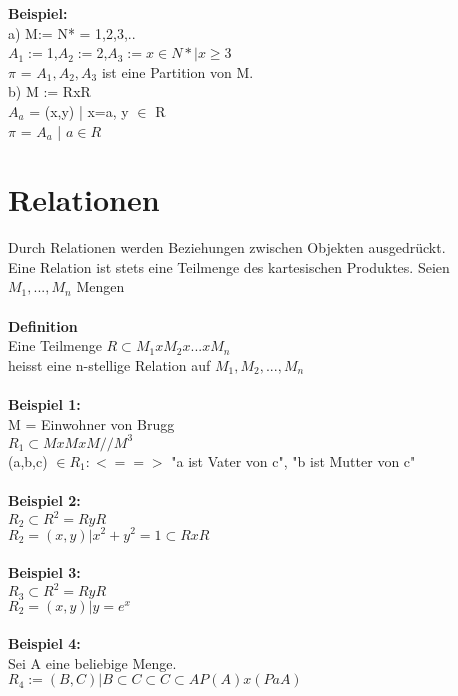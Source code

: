 \documentclass[11pt,a4paper]{article}
\begin{document}
\textbf{Beispiel:}\\
a) M:= N* = {1,2,3,..} \\
$A_1 := ${1},$ A_2 := ${2},$ A_3 := ${$x \in N* | x \geq 3$} \\
$\pi$ = {$A_1,A_2,A_3$} ist eine Partition von M.\\
b) M := RxR \\
$A_a$ = {(x,y) | x=a, y $\in$ R }\\

$\pi$ = { $A_a $ | $a \in R $}

\section{Relationen}
Durch Relationen werden Beziehungen zwischen Objekten ausgedrückt.\\
Eine Relation ist stets eine Teilmenge des kartesischen Produktes.
Seien $M_1,...,M_n$ Mengen\\\\

\textbf{Definition}\\
Eine Teilmenge $ R \subset M_1 x M_2 x ... x M_n$\\
heisst eine n-stellige Relation auf $M_1, M_2,...,M_n$\\\\

\textbf{Beispiel 1:}\\
M = { Einwohner von Brugg }\\
$R_1 \subset MxMxM // M^3 $\\
(a,b,c) $ \in R_1 : <==> $ "a ist Vater von c", "b ist Mutter von c"\\\\

\textbf{Beispiel 2:}\\
$R_2 \subset R^2 = RyR$\\
$R_2 = {(x,y) | x^2+y^2=1} \subset RxR$\\\\

\textbf{Beispiel 3:}\\
$R_3 \subset R^2 = RyR$\\
$R_2 = {(x,y) | y=e^x}$\\\\

\textbf{Beispiel 4:}\\
Sei A eine beliebige Menge.\\
$R_4 := {(B,C) | B \subset C \subset C \subset A} P(A)x(PaA)$\\
\end{document}
